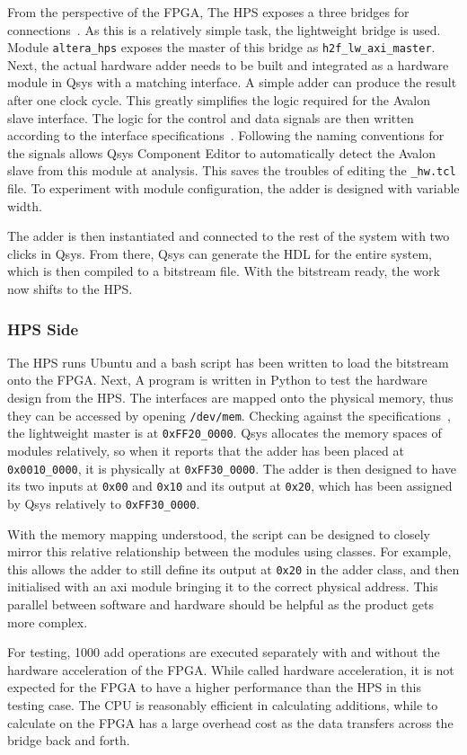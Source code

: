 From the perspective of the FPGA, The HPS exposes a three bridges for
connections~\cite{Altera6}.
As this is a relatively simple task, the lightweight bridge is used.
Module \texttt{altera\_hps} exposes the master of this bridge as
\texttt{h2f\_lw\_axi\_master}.
Next, the actual hardware adder needs to be built and integrated as a hardware
module in Qsys with a matching interface.
A simple adder can produce the result after one clock cycle.
This greatly simplifies the logic required for the Avalon slave interface.
The logic for the control and data signals are then written according to the
interface specifications~\cite{Intel3}.
Following the naming conventions for the signals allows Qsys Component Editor
to automatically detect the Avalon slave from this module at analysis.
This saves the troubles of editing the \texttt{\_hw.tcl} file.
To experiment with module configuration, the adder is designed with variable
width.

The adder is then instantiated and connected to the rest of the system with
two clicks in Qsys.
From there, Qsys can generate the HDL for the entire system, which is then
compiled to a bitstream file.
With the bitstream ready, the work now shifts to the HPS.

\subsubsection{\textbf{HPS Side}}
The HPS runs Ubuntu and a bash script has been written to load the bitstream
onto the FPGA.
Next, A program is written in Python to test the hardware design from the HPS.
The interfaces are mapped onto the physical memory, thus they can be accessed
by opening \texttt{/dev/mem}.
Checking against the specifications~\cite{Altera6}, the lightweight master is
at \texttt{0xFF20\_0000}.
Qsys allocates the memory spaces of modules relatively, so when it reports
that the adder has been placed at \texttt{0x0010\_0000}, it is physically at
\texttt{0xFF30\_0000}.
The adder is then designed to have its two inputs at \texttt{0x00} and
\texttt{0x10} and its output at \texttt{0x20}, which has been assigned by Qsys
relatively to \texttt{0xFF30\_0000}.

With the memory mapping understood, the script can be designed to closely
mirror this relative relationship between the modules using classes.
For example, this allows the adder to still define its output at \texttt{0x20}
in the adder class, and then initialised with an axi module bringing it to the
correct physical address.
This parallel between software and hardware should be helpful as the product
gets more complex.

For testing, 1000 add operations are executed separately with and without the
hardware acceleration of the FPGA.
While called hardware acceleration, it is not expected for the FPGA to have
a higher performance than the HPS in this testing case.
The CPU is reasonably efficient in calculating additions, while to calculate
on the FPGA has a large overhead cost as the data transfers across the bridge
back and forth.


